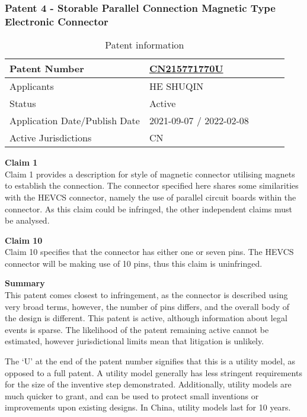\documentclass [12pt]{article}
\begin{document}
\subsubsection{Patent 4 - Storable Parallel Connection Magnetic Type Electronic Connector}
\begin{table}[H]
    \centering
    \setlength{\arrayrulewidth}{1.5pt}
    \begin{tabular}{|p{0.5\linewidth}|p{0.5\linewidth}|}
    \hline
    Patent Number & \href{https://worldwide.espacenet.com/patent/search/family/080088809/publication/CN215771770U?q=CN215771770U}{CN215771770U}\\
    \hline
    Applicants &HE SHUQIN\\
    \hline
    Status & Active\\
    \hline
    Application Date/Publish Date & 2021-09-07 / 2022-02-08\\
    \hline
    Active Jurisdictions & CN\\
    \hline
    \end{tabular}
    \caption{Patent information}
    \label{table:mag_con4}
\end{table}
\textbf{Claim 1}\\
Claim 1 provides a description for style of magnetic connector utilising magnets to establish the connection. The connector specified here shares some similarities with the HEVCS connector, namely the use of parallel circuit boards within the connector. As this claim could be infringed, the other independent claims must be analysed.

\textbf{Claim 10}\\
Claim 10 specifies that the connector has either one or seven pins. The HEVCS connector will be making use of 10 pins, thus this claim is uninfringed.

\textbf{Summary}\\
This patent comes closest to infringement, as the connector is described using very broad terms, however, the number of pins differs, and the overall body of the design is different. This patent is active, although information about legal events is sparse. The likelihood of the patent remaining active cannot be estimated, however jurisdictional limits mean that litigation is unlikely.

The ‘U’ at the end of the patent number signifies that this is a utility model, as opposed to a full patent. A utility model generally has less stringent requirements for the size of the inventive step demonstrated. Additionally, utility models are much quicker to grant, and can be used to protect small inventions or improvements upon existing designs. In China, utility models last for 10 years.
\end{document}
